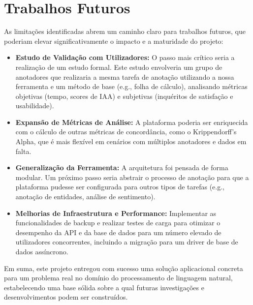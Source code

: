 \section{Trabalhos Futuros}

As limitações identificadas abrem um caminho claro para trabalhos futuros, que poderiam elevar significativamente o impacto e a maturidade do projeto:

\begin{itemize}
    \item \textbf{Estudo de Validação com Utilizadores:} O passo mais crítico seria a realização de um estudo formal. Este estudo envolveria um grupo de anotadores que realizaria a mesma tarefa de anotação utilizando a nossa ferramenta e um método de base (e.g., folha de cálculo), analisando métricas objetivas (tempo, scores de IAA) e subjetivas (inquéritos de satisfação e usabilidade).
    \item \textbf{Expansão de Métricas de Análise:} A plataforma poderia ser enriquecida com o cálculo de outras métricas de concordância, como o Krippendorff's Alpha, que é mais flexível em cenários com múltiplos anotadores e dados em falta.
    \item \textbf{Generalização da Ferramenta:} A arquitetura foi pensada de forma modular. Um próximo passo seria abstrair o processo de anotação para que a plataforma pudesse ser configurada para outros tipos de tarefas (e.g., anotação de entidades, análise de sentimento).
    \item \textbf{Melhorias de Infraestrutura e Performance:} Implementar as funcionalidades de backup e realizar testes de carga para otimizar o desempenho da API e da base de dados para um número elevado de utilizadores concorrentes, incluindo a migração para um driver de base de dados assíncrono.
\end{itemize}

Em suma, este projeto entregou com sucesso uma solução aplicacional concreta para um problema real no domínio do processamento de linguagem natural, estabelecendo uma base sólida sobre a qual futuras investigações e desenvolvimentos podem ser construídos.
